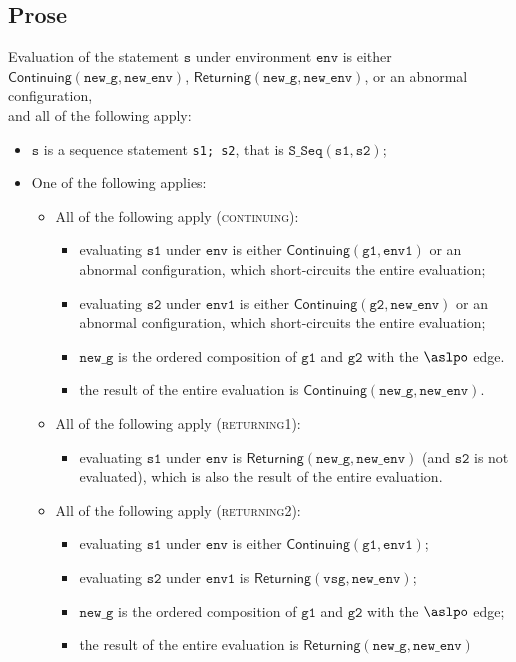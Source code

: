 \documentclass{book}
\newcommand\ProseOrAbnormal[0]{or an abnormal configuration, which short-circuits the entire evaluation}
\newcommand\Continuing[0]{\textsf{Continuing}}
\newcommand\Returning[0]{\textsf{Returning}}
\newcommand\newenv[0]{\texttt{new\_env}}
\newcommand\env[0]{\texttt{env}}
\newcommand\envone[0]{\texttt{env1}}
\newcommand\newg[0]{\texttt{new\_g}}
\newcommand\vs[0]{\texttt{s}}
\newcommand\vvsg[0]{\texttt{vsg}}
\newcommand\vsone[0]{\texttt{s1}}
\newcommand\vstwo[0]{\texttt{s2}}
\newcommand\vgone[0]{\texttt{g1}}
\newcommand\vgtwo[0]{\texttt{g2}}
\begin{document}
  \subsection{Prose}
  Evaluation of the statement $\vs$ under environment $\env$ is
  either \\ $\Continuing(\newg, \newenv)$, $\Returning(\newg, \newenv)$,
  or an abnormal configuration, \\
  and all of the following apply:
  \begin{itemize}
    \item $\vs$ is a sequence statement \texttt{s1; s2}, that is $\texttt{S\_Seq}(\vsone, \vstwo)$;
    \item One of the following applies:
    \begin{itemize}
      \item All of the following apply (\textsc{continuing}):
      \begin{itemize}
        \item evaluating $\vsone$ under $\env$ is either $\Continuing(\vgone, \envone)$
        \ProseOrAbnormal;
        \item evaluating $\vstwo$ under $\envone$ is either $\Continuing(\vgtwo, \newenv)$
        \ProseOrAbnormal;
        \item $\newg$ is the ordered composition of $\vgone$ and $\vgtwo$ with the $\aslpo$ edge.
        \item the result of the entire evaluation is $\Continuing(\newg, \newenv)$.
      \end{itemize}

      \item All of the following apply (\textsc{returning1}):
      \begin{itemize}
        \item evaluating $\vsone$ under $\env$ is $\Returning(\newg, \newenv)$
        (and $\vstwo$ is not evaluated), which is also the result of the entire evaluation.
      \end{itemize}

      \item All of the following apply (\textsc{returning2}):
      \begin{itemize}
        \item evaluating $\vsone$ under $\env$ is either $\Continuing(\vgone, \envone)$;
        \item evaluating $\vstwo$ under $\envone$ is $\Returning(\vvsg, \newenv)$;
        \item $\newg$ is the ordered composition of $\vgone$ and $\vgtwo$ with the $\aslpo$ edge;
        \item the result of the entire evaluation is $\Returning(\newg, \newenv)$
      \end{itemize}
    \end{itemize}
  \end{itemize}
\end{document}
